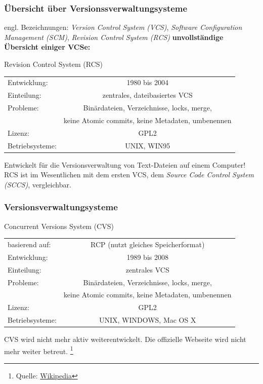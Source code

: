 \documentclass{beamer}
\begin{document}
\begin{frame}\frametitle{Übersicht über Versionssverwaltungsysteme} 
engl. Bezeichnungen: \textit{Version Control System (VCS)}, \textit{Software Configuration Management (SCM)}, \textit{Revision Control System (RCS)}
\vspace*{0.15cm}
\textbf{unvollständige Übersicht einiger VCSe:}
\begin{block}{Revision Control System (RCS)}
	\begin{tabular}{l c}
Entwicklung: & 1980 bis 2004  \\  
Einteilung: & zentrales, dateibasiertes VCS \\ 
Probleme: & Binärdateien, Verzeichnisse, locks, merge, \\
          & keine Atomic commits, keine Metadaten, umbenennen  \\
Lizenz: & GPL2 \\
Betriebsysteme: & UNIX, WIN95 \\

\end{tabular} 

\vspace*{0.3cm}
Entwickelt für die Versionsverwaltung von Text-Dateien auf einem Computer!
RCS ist im Wesentlichen mit dem ersten VCS, dem \textit{Source Code Control System (SCCS)}, vergleichbar.
\end{block}
\end{frame}

\begin{frame}\frametitle{Versionsverwaltungsysteme} 
\begin{block}{Concurrent Versions System (CVS)}
	\begin{tabular}{l c}
basierend auf: & RCP (nutzt gleiches Speicherformat) \\ 
Entwicklung: & 1989 bis 2008  \\  
Einteilung: & zentrales VCS \\ 
Probleme: & Binärdateien, Verzeichnisse, locks, merge, \\
          & keine Atomic commits, keine Metadaten, umbenennen  \\
Lizenz: & GPL2 \\
Betriebsysteme: & UNIX, WINDOWS, Mac OS X \\
\end{tabular} 

\vspace*{0.3cm}
CVS wird nicht mehr aktiv weiterentwickelt. Die offizielle Webseite wird nicht mehr weiter betreut. \footnote{Quelle: \href{http://de.wikipedia.org/wiki/Concurrent_Versions_System}{Wikipedia}}
\end{block}
\end{frame}
\end{document}
